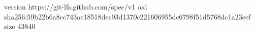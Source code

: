 version https://git-lfs.github.com/spec/v1
oid sha256:59b22b6a8cc743ae18518dec93d1370c221606955dc6798f51d5768dc1a23eef
size 43840
